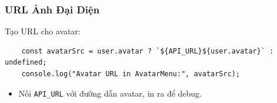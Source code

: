             \subsubsection{URL Ảnh Đại Diện}
                \hspace*{0.6cm}Tạo URL cho avatar:
                \begin{lstlisting}
    const avatarSrc = user.avatar ? `${API_URL}${user.avatar}` : undefined;
    console.log("Avatar URL in AvatarMenu:", avatarSrc);
                \end{lstlisting}
                \begin{itemize}
                    \item Nối \texttt{API\_URL} với đường dẫn avatar, in ra để debug.
                \end{itemize}

